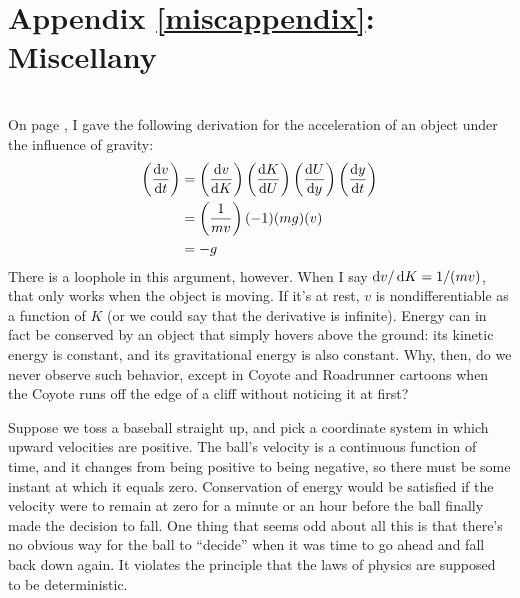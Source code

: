 \label{miscappendix}%
\appendix\chapter{Appendix \ref{miscappendix}: Miscellany}

\noindent{}\\
On page \pageref{hoveringrefback}\label{hovering}, I gave the following derivation for the
acceleration of an object under the influence of gravity:
        \begin{align*}
                \left(\frac{\der{}v}{\der{}t}\right)%
                        &=        \left(\frac{\der{}v}{\der{}K}\right)%
                                \left(\frac{\der{}K}{\der{}U}\right)%
                                \left(\frac{\der{}U}{\der{}y}\right)%
                                \left(\frac{\der{}y}{\der{}t}\right) \\
                        &= \left(\frac{1}{mv}\right)(-1)(mg)(v) \\
                        &= -g 
        \end{align*}
There is a loophole in this argument, however. When I say $\operatorname{d\!} v/\operatorname{d\!} K=1/(mv)$, that
only works when the object is moving. If it's at rest, $v$ is nondifferentiable as a function
of $K$ (or we could say that the derivative is infinite). Energy can in fact be conserved
by an object that simply hovers above the ground: its kinetic energy is constant, and its gravitational
energy is also constant. Why, then, do we never observe such behavior, except in Coyote and Roadrunner
cartoons when the Coyote runs off the edge of a cliff without noticing it at first?

Suppose we toss a baseball straight up, and
pick a coordinate system in which upward velocities are positive. The ball's velocity is a continuous
function of time, and it changes from being positive to being negative, so there must be some instant at
which it equals zero. Conservation of energy would be satisfied if the velocity were to remain
at zero for a minute or an hour before the ball finally made the decision to fall. One thing that seems
odd about all this is that there's no obvious way for the ball to ``decide'' when it was time to go ahead
and fall back down again. It violates the principle that the laws of physics are supposed to be deterministic.

